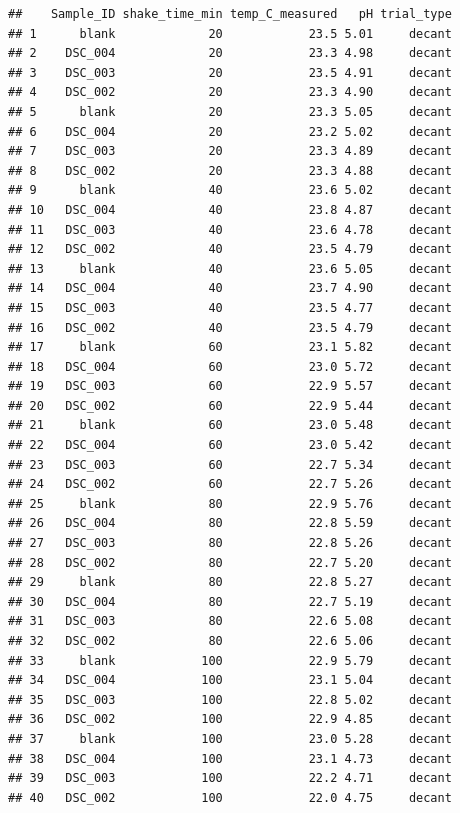\documentclass[
]{article}
\begin{document}
\begin{verbatim}
##    Sample_ID shake_time_min temp_C_measured   pH trial_type
## 1      blank             20            23.5 5.01     decant
## 2    DSC_004             20            23.3 4.98     decant
## 3    DSC_003             20            23.5 4.91     decant
## 4    DSC_002             20            23.3 4.90     decant
## 5      blank             20            23.3 5.05     decant
## 6    DSC_004             20            23.2 5.02     decant
## 7    DSC_003             20            23.3 4.89     decant
## 8    DSC_002             20            23.3 4.88     decant
## 9      blank             40            23.6 5.02     decant
## 10   DSC_004             40            23.8 4.87     decant
## 11   DSC_003             40            23.6 4.78     decant
## 12   DSC_002             40            23.5 4.79     decant
## 13     blank             40            23.6 5.05     decant
## 14   DSC_004             40            23.7 4.90     decant
## 15   DSC_003             40            23.5 4.77     decant
## 16   DSC_002             40            23.5 4.79     decant
## 17     blank             60            23.1 5.82     decant
## 18   DSC_004             60            23.0 5.72     decant
## 19   DSC_003             60            22.9 5.57     decant
## 20   DSC_002             60            22.9 5.44     decant
## 21     blank             60            23.0 5.48     decant
## 22   DSC_004             60            23.0 5.42     decant
## 23   DSC_003             60            22.7 5.34     decant
## 24   DSC_002             60            22.7 5.26     decant
## 25     blank             80            22.9 5.76     decant
## 26   DSC_004             80            22.8 5.59     decant
## 27   DSC_003             80            22.8 5.26     decant
## 28   DSC_002             80            22.7 5.20     decant
## 29     blank             80            22.8 5.27     decant
## 30   DSC_004             80            22.7 5.19     decant
## 31   DSC_003             80            22.6 5.08     decant
## 32   DSC_002             80            22.6 5.06     decant
## 33     blank            100            22.9 5.79     decant
## 34   DSC_004            100            23.1 5.04     decant
## 35   DSC_003            100            22.8 5.02     decant
## 36   DSC_002            100            22.9 4.85     decant
## 37     blank            100            23.0 5.28     decant
## 38   DSC_004            100            23.1 4.73     decant
## 39   DSC_003            100            22.2 4.71     decant
## 40   DSC_002            100            22.0 4.75     decant

\end{verbatim}
\end{document}

